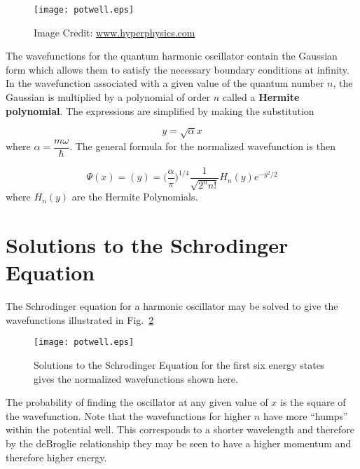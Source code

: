 \documentclass{article}
\begin{document}
\begin{figure}[h]
\begin{center}
\texttt{[image: potwell.eps]}
\caption{\label{fig:1}Image Credit: \url{www.hyperphysics.com}}
\end{center}
\end{figure}

\noindent The wavefunctions for the quantum harmonic oscillator contain the Gaussian form which allows them to satisfy the necessary boundary conditions at infinity. In the wavefunction associated with a given value of the quantum number $n$, the Gaussian is multiplied by a polynomial of order $n$ called a \textbf{Hermite polynomial}. The expressions are simplified by making the substitution

\begin{equation}
\label{eq:6}
y=\sqrt{\alpha}x
\end{equation}
where $\alpha=\dfrac{m\omega}{\hbar}$. The general formula for the normalized wavefunction is then

\begin{equation}
\label{eq:7}
\Psi(x)=(y)=\Big(\frac{\alpha}{\pi}\Big)^{1/4}\frac{1}{\sqrt{2^{n}n!}}H_n(y)e^{-y^{2}/2}
\end{equation}
where $H_n(y)$ are the Hermite Polynomials.

\section{Solutions to the Schrodinger Equation}

\noindent The Schrodinger equation for a harmonic oscillator may be solved to give the wavefunctions illustrated in Fig.~\ref{fig:2}

\begin{figure}[h]
\begin{center}
\texttt{[image: potwell.eps]}
\caption{\label{fig:2}Solutions to the Schrodinger Equation for the first six energy states gives the normalized wavefunctions shown here.}
\end{center}
\end{figure}

\noindent The probability of finding the oscillator at any given value of $x$ is the square of the wavefunction. Note that the wavefunctions for higher $n$ have more “humps” within the potential well. This corresponds to a shorter wavelength and therefore by the deBroglie relationship they may be seen to have a higher momentum and therefore higher energy.\\
\end{document}
